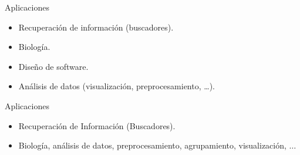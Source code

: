 \documentclass{beamer}
\begin{document}
\begin{frame}{Aplicaciones}

\begin{itemize}
    \item Recuperación de información (buscadores).
    \vspace{4mm}
    \item Biología.
    \vspace{4mm}
    \item Diseño de software.
    \vspace{4mm}
    \item Análisis de datos (visualización, preprocesamiento, \dots ).
\end{itemize}
\end{frame}
\iffalse
\begin{frame}{Aplicaciones}
    \vspace{1mm}
    \begin{itemize}
        \item Recuperación de Información (Buscadores).
        \item Biología, análisis de datos, preprocesamiento, agrupamiento, visualización, $\dots$
    \end{itemize} 
    \vspace{-20mm}
    \pause
    \begin{columns}
    \begin{column}{0.5\textwidth}
    \vspace{15mm}
    \begin{table}[H]
\end{table}
\end{column}
\end{columns}
\end{frame}
\end{document}

